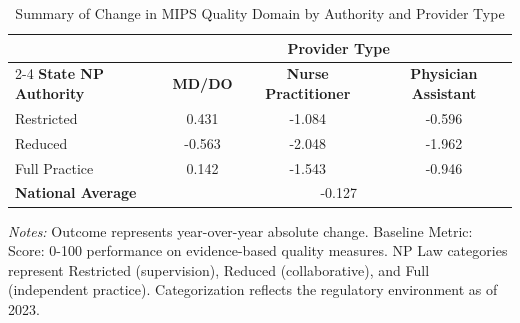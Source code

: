 \begin{table}[htbp]
    \centering
    \caption{Summary of Change in MIPS Quality Domain by Authority and Provider Type}
    \label{tab:d_mips_quality_score_provtype}
    \vspace{0.2cm}
    \begin{tabular}{lccc}
        \toprule
        & \multicolumn{3}{c}{\textbf{Provider Type}} \\
        \cmidrule(lr){2-4}
        \textbf{State NP Authority} & \textbf{MD/DO} & \textbf{Nurse Practitioner} & \textbf{Physician Assistant} \\
        \midrule
        Restricted & 0.431 & -1.084 & -0.596 \\
        Reduced & -0.563 & -2.048 & -1.962 \\
        Full Practice & 0.142 & -1.543 & -0.946 \\
        \midrule
        \textbf{National Average} & \multicolumn{3}{c}{-0.127} \\
        \bottomrule
    \end{tabular}
    \vspace{0.1cm}
    \begin{minipage}{0.85\textwidth}
        \footnotesize \textit{Notes:} Outcome represents year-over-year absolute change. Baseline Metric: Score: 0-100 performance on evidence-based quality measures. NP Law categories represent Restricted (supervision), Reduced (collaborative), and Full (independent practice). Categorization reflects the regulatory environment as of 2023.
    \end{minipage}
\end{table}